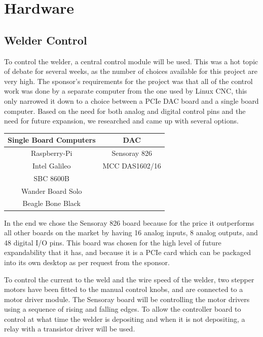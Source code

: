 \documentclass[12pt]{article}
\newlength\tindent
\renewcommand{\indent}{\hspace*{\tindent}}
\begin{document}
\clearpage

\section{Hardware}

\subsection{Welder Control}

\indent To control the welder, a central control module will be used. This was a hot topic of debate for several weeks, as the number of choices available for this project are very high. The sponsor's requirements for the project was that all of the control work was done by a separate computer from the one used by Linux CNC, this only narrowed it down to a choice between a PCIe DAC board and a single board computer. Based on the need for both analog and digital control pins and the need for future expansion, we researched and came up with several options.


\begin{center}


\begin{tabular}{ |c | c | }


  \hline
  \textbf{Single Board Computers} & \textbf{DAC} \\ \hline            
  Raspberry-Pi & Sensoray 826 \\ \hline      
  Intel Galileo & MCC DAS1602/16  \\ \hline      
  SBC 8600B &  \\ \hline
    Wander Board Solo &  \\ \hline
      Beagle Bone Black &  \\ \hline
\end{tabular}
\end{center}


\indent In the end we chose the Sensoray 826 board because for the price it outperforms all other boards on the market by having 16 analog inputs, 8 analog outputs, and 48 digital I/O pins. This board was chosen for the high level of future expandability that it has, and because it is a PCIe card which can be packaged into its own desktop as per request from the sponsor.\



To control the current to the weld and the wire speed of the welder, two stepper motors have been fitted to the  manual control knobs, and are connected to a motor driver module. The Sensoray board will be controlling the motor drivers using a sequence of rising and falling edges. To allow the controller board to control at what time the welder is depositing and when it is not depositing, a relay with a transistor driver will be used.\\
\end{document}
